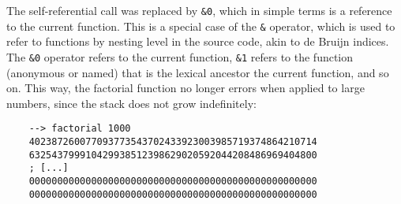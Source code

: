 The self-referential call was replaced by \verb|&0|, which in simple terms is a reference to the current function. This is a special case of the \verb|&| operator, which is used to refer to functions by nesting level in the source code, akin to de Bruijn indices. The \verb|&0| operator refers to the current function, \verb|&1| refers to the function (anonymous or named) that is the lexical ancestor the current function, and so on. This way, the factorial function no longer errors when applied to large numbers, since the stack does not grow indefinitely:

\begin{Verbatim}
    --> factorial 1000
    402387260077093773543702433923003985719374864210714
    632543799910429938512398629020592044208486969404800
    ; [...]
    000000000000000000000000000000000000000000000000000
    000000000000000000000000000000000000000000000000000
\end{Verbatim}

